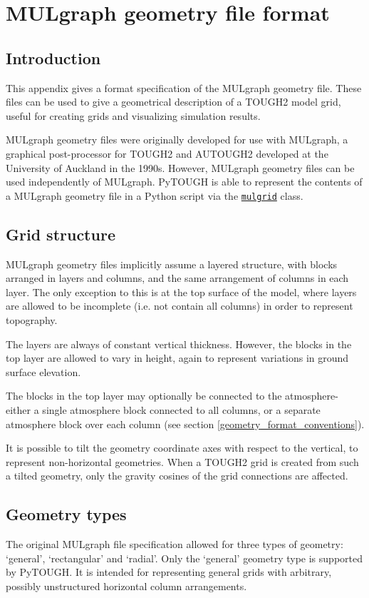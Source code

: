 \chapter{MULgraph geometry file format}
\label{geometry_file_format}

\section{Introduction}
This appendix gives a format specification of the MULgraph geometry file. These files can be used to give a geometrical description of a TOUGH2 model grid, useful for creating grids and visualizing simulation results.

MULgraph geometry files were originally developed for use with MULgraph, a graphical post-processor for TOUGH2 and AUTOUGH2 \citep{mulgraph} developed at the University of Auckland in the 1990s. However, MULgraph geometry files can be used independently of MULgraph. PyTOUGH is able to represent the contents of a MULgraph geometry file in a Python script via the \hyperref[mulgrids]{\texttt{mulgrid}} class.

\section{Grid structure}
MULgraph geometry files implicitly assume a layered structure, with blocks arranged in layers and columns, and the same arrangement of columns in each layer. The only exception to this is at the top surface of the model, where layers are allowed to be incomplete (i.e. not contain all columns) in order to represent topography.

The layers are always of constant vertical thickness. However, the blocks in the top layer are allowed to vary in height, again to represent variations in ground surface elevation.

The blocks in the top layer may optionally be connected to the atmosphere- either a single atmosphere block connected to all columns, or a separate atmosphere block over each column (see section \ref{geometry_format_conventions}).

It is possible to tilt the geometry coordinate axes with respect to the vertical, to represent non-horizontal geometries. When a TOUGH2 grid is created from such a tilted geometry, only the gravity cosines of the grid connections are affected.

\section{Geometry types}
The original MULgraph file specification allowed for three types of geometry: `general', `rectangular' and `radial'. Only the `general' geometry type is supported by PyTOUGH. It is intended for representing general grids with arbitrary, possibly unstructured horizontal column arrangements.

